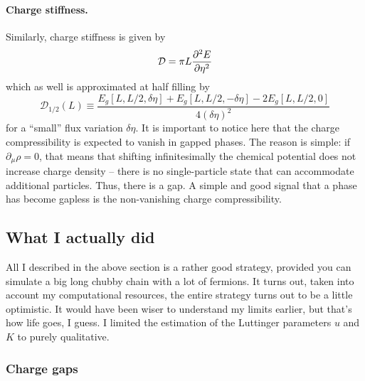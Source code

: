 \paragraph{Charge stiffness.}
Similarly, charge stiffness is given by
\[
	\mathcal{D} = \pi L \pdv[2]{E}{\eta}
\]
which as well is approximated at half filling by
\begin{equation}\label{eq:charge-stiffness-approximation}
	\mathcal{D}_{1/2}(L) \equiv
	\frac{E_g[L,L/2,\delta\eta]+E_g[L,L/2,-\delta\eta]-2E_g[L,L/2,0]}{4(\delta\eta)^2}
\end{equation}
for a ``small'' flux variation $\delta\eta$. It is important to notice here that the charge compressibility is expected to vanish in gapped phases. The reason is simple: if $\partial_\mu \rho=0$, that means that shifting infinitesimally the chemical potential does not increase charge density -- there is no single-particle state that can accommodate additional particles. Thus, there is a gap. A simple and good signal that a phase has become gapless is the non-vanishing charge compressibility.

\subsection{What I actually did}

All I described in the above section is a rather good strategy, provided you can simulate a big long chubby chain with a lot of fermions. It turns out, taken into account my computational resources, the entire strategy turns out to be a little optimistic. It would have been wiser to understand my limits earlier, but that's how life goes, I guess. I limited the estimation of the Luttinger parameters $u$ and $K$ to purely qualitative.

\subsubsection{Charge gaps}

